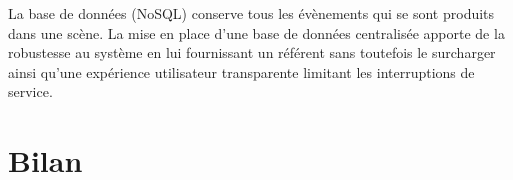 La base de données (\gls{NoSQL}) conserve tous les évènements qui se
sont produits dans une scène. 
La mise en place d'une base de données centralisée apporte de la robustesse au 
système en lui fournissant un référent sans toutefois le surcharger ainsi qu'une 
expérience utilisateur transparente limitant les interruptions de service.
\section{Bilan}


